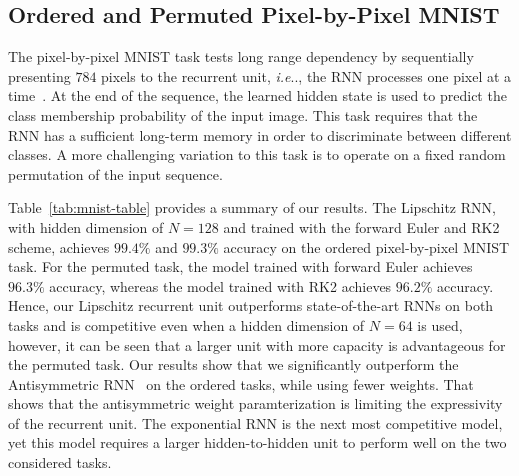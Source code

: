 \documentclass{article} \usepackage{iclr2021_conference,times}
\makeatletter
\DeclareRobustCommand\onedot{\futurelet\@let@token\@onedot}
\def\@onedot{\ifx\@let@token.\else.\null\fi\xspace}
\def\ie{\emph{i.e}\onedot} \def\Ie{\emph{I.e}\onedot}
\makeatother
\begin{document}
\subsection{Ordered and Permuted Pixel-by-Pixel MNIST}\label{sec:mnist}

The pixel-by-pixel MNIST task tests long range dependency by
sequentially presenting $784$ pixels to the recurrent unit, \ie, the RNN processes one pixel at a time~\citep{le2015simple}. 
At the end of the sequence, the learned hidden state is used to predict the class membership probability of the input image. This task requires that the RNN has a sufficient long-term memory in order to discriminate between different classes. A more challenging variation to this task is to operate on a fixed random permutation of the input sequence.


Table~\ref{tab:mnist-table} provides a summary of our results.
The Lipschitz RNN, with hidden dimension of $N=128$ and trained with the forward Euler and RK2 scheme, achieves $99.4\%$ and $99.3\%$ accuracy on the ordered pixel-by-pixel MNIST task. 
For the permuted task, the model trained with forward Euler achieves $96.3\%$ accuracy, whereas the model trained with RK2 achieves $96.2\%$ accuracy.
Hence, our Lipschitz recurrent unit outperforms state-of-the-art RNNs on both tasks and is competitive even when a hidden dimension of $N=64$ is used, however, it can be seen that a larger unit with more capacity is advantageous for the permuted task.
Our results show that we significantly outperform the Antisymmetric RNN~\citep{chang2018antisymmetricrnn} on the ordered tasks, while using fewer weights. That shows that the antisymmetric weight paramterization is limiting the expressivity of the recurrent unit.
The exponential RNN is the next most competitive model, yet this model requires a larger hidden-to-hidden unit to perform well on the two considered tasks. 
\end{document}
